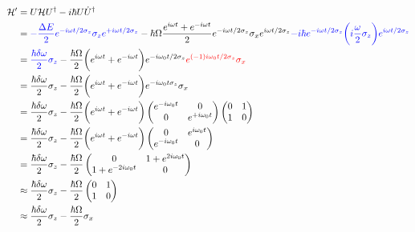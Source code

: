  \begin{equation}
 \begin{aligned}
 \mathcal{H'} & = U\mathcal{H}U^{\dagger} - i\hbar U\dot{U}^{\dagger}\\
 & = \textcolor{blue}{-\frac{\Delta E}{2} e^{-i\omega t/2\sigma_z} \sigma_z e^{+i\omega t/2\sigma_z}} -\hbar\Omega\frac{e^{i\omega t}+e^{-i\omega t}} {2} e^{-i\omega t/2\sigma_z} \sigma_x e^{i\omega t/2\sigma_z} \textcolor{blue}{- i\hbar e^{-i\omega t/2\sigma_z} \bigg(i\frac{\omega}{2}\sigma_z\bigg) e^{i\omega t/2\sigma_z}}\\
 & = \textcolor{blue}{\frac{\hbar\delta\omega}{2}\sigma_z} - \frac{\hbar\Omega}{2}\bigg(e^{i\omega t}+e^{-i\omega t}\bigg)e^{-i\omega_0t/2\sigma_z}{\color{red}{e^{(-1)i\omega_0t/2\sigma_z}\sigma_x}}\\
 & = \frac{\hbar\delta\omega}{2}\sigma_z -\frac{\hbar\Omega}{2}\bigg(e^{i\omega t}+e^{-i\omega t}\bigg){e^{-i\omega_0t\sigma_z}\sigma_x}\\
 & = \frac{\hbar\delta\omega}{2}\sigma_z -\frac{\hbar\Omega}{2}\bigg(e^{i\omega t}+e^{-i\omega t}\bigg)\begin{pmatrix}
 e^{-i\omega_0t}&0\\0&e^{+i\omega_0t}
 \end{pmatrix}\begin{pmatrix}
 0&1\\1&0
 \end{pmatrix}\\
 & = \frac{\hbar\delta\omega}{2}\sigma_z -\frac{\hbar\Omega}{2}\bigg(e^{i\omega t}+e^{-i\omega t}\bigg)\begin{pmatrix}
 0&e^{i\omega_0t}\\e^{-i\omega_0t}&0
 \end{pmatrix}
 \\
 & = \frac{\hbar\delta\omega}{2}\sigma_z -\frac{\hbar\Omega}{2}\begin{pmatrix}
 0&1+e^{2i\omega_0t}\\1+e^{-2i\omega_0t}&0
 \end{pmatrix}
 \\
 & \approx \frac{\hbar\delta\omega}{2}\sigma_z -\frac{\hbar\Omega}{2}\begin{pmatrix}
 0&1\\1&0
 \end{pmatrix}
 \\
 & \approx \frac{\hbar\delta\omega}{2}\sigma_z -\frac{\hbar\Omega}{2}\sigma_x
 \end{aligned}
 \label{eqn:detunedDrive}
 \end{equation}
 

